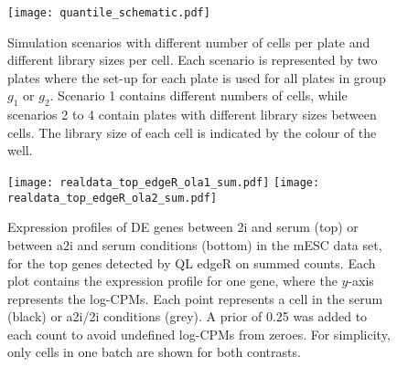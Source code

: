 \documentclass{article}
\begin{document}

\begin{figure}[p]
    \begin{center}
        \texttt{[image: quantile\_schematic.pdf]}
    \end{center}
    \caption{
        Simulation scenarios with different number of cells per plate and different library sizes per cell.
        Each scenario is represented by two plates where the set-up for each plate is used for all plates in group $g_1$ or $g_2$.
        Scenario 1 contains different numbers of cells, while scenarios 2 to 4 contain plates with different library sizes between cells.
        The library size of each cell is indicated by the colour of the well.
    }
    \label{fig:compsim}
\end{figure}

\begin{figure}[p]
    \begin{center}
        \texttt{[image: realdata\_top\_edgeR\_ola1\_sum.pdf]}
        \texttt{[image: realdata\_top\_edgeR\_ola2\_sum.pdf]}
    \end{center}
\caption{
    Expression profiles of DE genes between 2i and serum (top) or between a2i and serum conditions (bottom) in the mESC data set, 
        for the top genes detected by QL edgeR on summed counts.
    Each plot contains the expression profile for one gene, where the $y$-axis represents the log-CPMs.
    Each point represents a cell in the serum (black) or a2i/2i conditions (grey).
    A prior of 0.25 was added to each count to avoid undefined log-CPMs from zeroes.
    For simplicity, only cells in one batch are shown for both contrasts.
}
\label{fig:realdata}
\end{figure}



 
\end{document}
